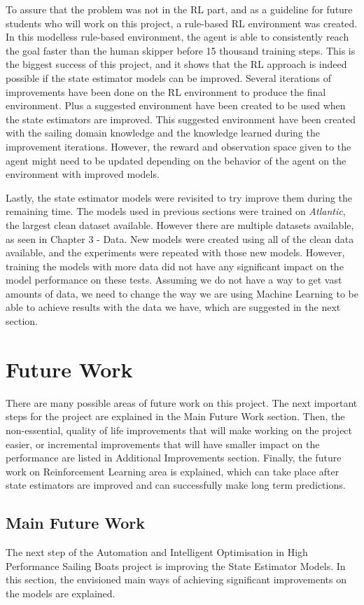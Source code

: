 \documentclass[12pt,twoside]{report}
\begin{document}
To assure that the problem was not in the RL part, and as a guideline for future students who will work on this project, a rule-based RL environment was created. In this modelless rule-based environment, the agent is able to consistently reach the goal faster than the human skipper before 15 thousand training steps. This is the biggest success of this project, and it shows that the RL approach is indeed possible if the state estimator models can be improved. Several iterations of improvements have been done on the RL environment to produce the final environment. Plus a suggested environment have been created to be used when the state estimators are improved. This suggested environment have been created with the sailing domain knowledge and the knowledge learned during the improvement iterations. However, the reward and observation space given to the agent might need to be updated depending on the behavior of the agent on the environment with improved models.

Lastly, the state estimator models were revisited to try improve them during the remaining time. The models used in previous sections were trained on \textit{Atlantic}, the largest clean dataset available. However there are multiple datasets available, as seen in Chapter 3 - Data. New models were created using all of the clean data available, and the experiments were repeated with those new models. However, training the models with more data did not have any significant impact on the model performance on these tests. Assuming we do not have a way to get vast amounts of data, we need to change the way we are using Machine Learning to be able to achieve results with the data we have, which are suggested in the next section.

\section{Future Work} \label{sec:future-work}
There are many possible areas of future work on this project. The next important steps for the project are explained in the Main Future Work section. Then, the non-essential, quality of life improvements that will make working on the project easier, or incremental improvements that will have smaller impact on the performance are listed in Additional Improvements section. Finally, the future work on Reinforcement Learning area is explained, which can take place after state estimators are improved and can successfully make long term predictions.

\subsection{Main Future Work}
The next step of the Automation and Intelligent Optimisation in High Performance Sailing Boats project is improving the State Estimator Models. In this section, the envisioned main ways of achieving significant improvements on the models are explained.
\end{document}
